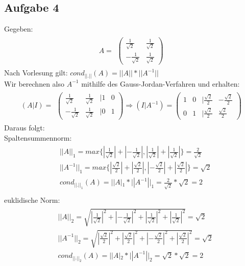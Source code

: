 \newpage
\subsection*{Aufgabe 4}
Gegeben:
\begin{align*} \label{eq8}
A=
\begin{split}
\begin{pmatrix}
\frac{1}{\sqrt2} & \frac{1}{\sqrt2} \\
-\frac{1}{\sqrt2} &\frac{1}{\sqrt2}
\end{pmatrix}
\end{split}
\end{align*}
Nach Vorlesung gilt: $cond_{||.||}(A)=||A||*||A^{-1}||$\\

Wir berechnen also $A^{-1}$ mithilfe des Gauss-Jordan-Verfahren und erhalten:
\begin{align*}
(A|I)=
\begin{split}
\begin{pmatrix}
\frac{1}{\sqrt2} & \frac{1}{\sqrt2} & |1 & 0 \\
-\frac{1}{\sqrt2} &\frac{1}{\sqrt2} & |0 & 1
\end{pmatrix}
\Rightarrow(I|A^{-1})=
\begin{pmatrix}
 1 & 0 & |\frac{\sqrt2}{2} & -\frac{\sqrt2}{2} \\
 0 & 1 & |\frac{\sqrt2}{2} & \frac{\sqrt2}{2}
\end{pmatrix}
\end{split}
\end{align*}
Daraus folgt:\\
Spaltensummennorm:
\begin{align*}
\begin{split}
&||A||_1=max\{|\frac{1}{\sqrt2}|+|-\frac{1}{\sqrt2}|, |\frac{1}{\sqrt2}|+|\frac{1}{\sqrt2}|\}=\frac{2}{\sqrt2}\\
&||A^{-1}||_1=max\{|\frac{\sqrt2}{2}|+|\frac{\sqrt2}{2}|, |-\frac{\sqrt2}{2}|+|\frac{\sqrt2}{2}|\}={\sqrt2}\\
& cond_{||.||_1}(A)=||A|_1*||A^{-1}||_1=\frac{2}{\sqrt2} * {\sqrt2} = 2\\
\end{split}
\end{align*}
euklidische Norm:
\begin{align*}
\begin{split}
&||A||_2=\sqrt{|\frac{1}{\sqrt2}|^2+|-\frac{1}{\sqrt2}|^2+|\frac{1}{\sqrt2}|^2+|\frac{1}{\sqrt2}|^2}=\sqrt{2}\\
&||A^{-1}||_2=\sqrt{|\frac{\sqrt2}{2}|^2+|\frac{\sqrt2}{2}|^2 + |-\frac{\sqrt2}{2}|^2 +|\frac{\sqrt2}{2}|^2}=\sqrt{2}\\
& cond_{||.||_2}(A)=||A|_2*||A^{-1}||_2=\sqrt{2}*\sqrt{2}=2\\
\end{split}
\end{align*}
